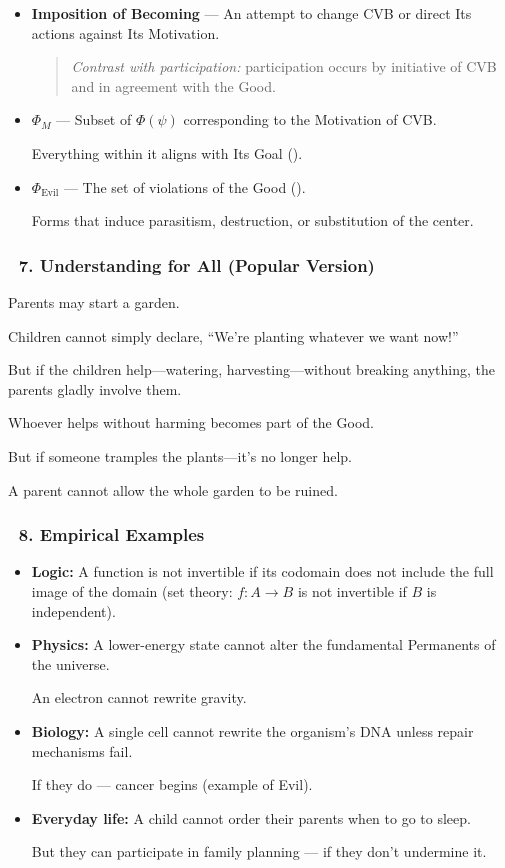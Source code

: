 \documentclass[12pt]{article}
\begin{document}
\begin{itemize}
\item \textbf{Imposition of Becoming} — An attempt to change CVB or direct Its actions against Its Motivation.
\begin{quote}
\textit{Contrast with participation:} participation occurs by initiative of CVB and in agreement with the Good.
\end{quote}

\item $\Phi_M$ — Subset of $\Phi(\psi)$ corresponding to the Motivation of CVB.

Everything within it aligns with Its Goal (\text{[18]}).

\item $\Phi_{\text{Evil}}$ — The set of violations of the Good (\text{[11.3.2]}).

Forms that induce parasitism, destruction, or substitution of the center.
\end{itemize}

\subsubsection*{🔹 7. Understanding for All (Popular Version)}

Parents may start a garden.

Children cannot simply declare, ``We’re planting whatever we want now!''

But if the children help—watering, harvesting—without breaking anything, the parents gladly involve them.

Whoever helps without harming becomes part of the Good.

But if someone tramples the plants—it’s no longer help.

A parent cannot allow the whole garden to be ruined.

\subsubsection*{🔹 8. Empirical Examples}

\begin{itemize}
\item \textbf{Logic:}
A function is not invertible if its codomain does not include the full image of the domain (set theory: $f: A \to B$ is not invertible if $B$ is independent).

\item \textbf{Physics:}
A lower-energy state cannot alter the fundamental Permanents of the universe.

An electron cannot rewrite gravity.

\item \textbf{Biology:}
A single cell cannot rewrite the organism’s DNA unless repair mechanisms fail.

If they do — cancer begins (example of Evil).

\item \textbf{Everyday life:}
A child cannot order their parents when to go to sleep.

But they can participate in family planning — if they don’t undermine it.
\end{itemize}
\end{document}
